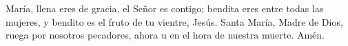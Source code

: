 María, llena eres de gracia, el Señor es contigo; bendita eres entre todas las mujeres,
y bendito es el fruto de tu vientre, Jesús. Santa María, Madre de Dios, ruega por nosotros pecadores,
ahora u en el hora de nuestra muerte. Amén.